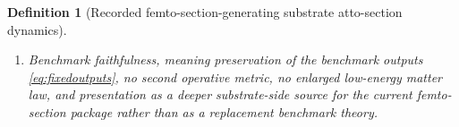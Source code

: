 \documentclass[11pt]{article}
\newcommand{\FemtoSectionShell}[1]{\mathcal Z_{#1}^{\mathrm{femtosec}}}
\newcommand{\AttoSectionProj}[1]{\Pi_{#1}^{\mathrm{attosec}}}
\newcommand{\AttoSectionFiber}[2]{\mathcal F_{#1}^{\mathrm{attosec}}(#2)}
\newcommand{\AttoSectionFunctional}[1]{\mathscr A_{#1}^{\mathrm{attosec}}}
\newcommand{\AttoSectionShell}[1]{\mathcal Z_{#1}^{\mathrm{attosec}}}
\newtheorem{definition}{Definition}
\begin{document}
\begin{definition}[Recorded femto-section-generating substrate atto-section dynamics]
\begin{enumerate}
\[\begin{array}{l}
    \AttoSectionFunctional{\sigma}(v)
    =
    \displaystyle\min_{w\in\AttoSectionFiber{\sigma}{\AttoSectionProj{\sigma}(v)}}
    \AttoSectionFunctional{\sigma}(w)
    \end{array}
    \right\},
    \]
    and
    \[
    \AttoSectionProj{\sigma}\big|_{\AttoSectionShell{\sigma}}
    :
    \AttoSectionShell{\sigma}
    \xrightarrow{\cong}
    \FemtoSectionShell{\sigma}
    \]
    is a diffeomorphism.
    \item Benchmark faithfulness, meaning preservation of the benchmark outputs \eqref{eq:fixedoutputs}, no second operative metric, no enlarged low-energy matter law, and presentation as a deeper substrate-side source for the current femto-section package rather than as a replacement benchmark theory.
\end{enumerate}
\end{definition}
\end{document}
